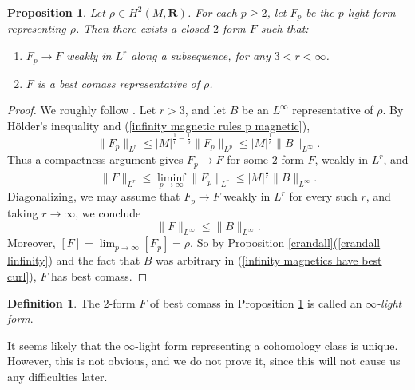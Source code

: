 \documentclass[reqno,11pt]{amsart}
\newcommand{\RR}{\mathbf{R}}
\newcommand{\dfn}[1]{\emph{#1}\index{#1}}
\newtheorem{proposition}[theorem]{Proposition}
\theoremstyle{definition}
\newtheorem{definition}[theorem]{Definition}
\numberwithin{equation}{section}
\begin{document}
\begin{proposition}\label{existence infinity}
Let $\rho \in H^2(M, \RR)$.
For each $p \geq 2$, let $F_p$ be the $p$-light form representing $\rho$. Then there exists a closed $2$-form $F$ such that:
\begin{enumerate}
\item $F_p \to F$ weakly in $L^r$ along a subsequence, for any $3 < r < \infty$.
\item $F$ is a best comass representative of $\rho$.
\end{enumerate}
\end{proposition}
\begin{proof}
We roughly follow \cite[\S3]{Lindqvist14}.
Let $r > 3$, and let $B$ be an $L^\infty$ representative of $\rho$.
By H\"older's inequality and (\ref{infinity magnetic rules p magnetic}),
\begin{equation}\label{uniform bounds in p by best curl}
	\|F_p\|_{L^r} \leq |M|^{\frac{1}{r} - \frac{1}{p}} \|F_p\|_{L^p} \leq |M|^{\frac{1}{r}} \|B\|_{L^\infty}.
\end{equation}
Thus a compactness argument gives $F_p \to F$ for some $2$-form $F$, weakly in $L^r$, and 
$$\|F\|_{L^r} \leq \liminf_{p \to \infty} \|F_p\|_{L^r} \leq |M|^{\frac{1}{r}} \|B\|_{L^\infty}.$$
Diagonalizing, we may assume that $F_p \to F$ weakly in $L^r$ for every such $r$, and taking $r \to \infty$, we conclude 
\begin{equation}\label{infinity magnetics have best curl}
	\|F\|_{L^\infty} \leq \|B\|_{L^\infty}.
\end{equation}
Moreover, $[F] = \lim_{p \to \infty} [F_p] = \rho$.
So by Proposition \ref{crandall}(\ref{crandall linfinity}) and the fact that $B$ was arbitrary in (\ref{infinity magnetics have best curl}), $F$ has best comass.
\end{proof}

\begin{definition}
The $2$-form $F$ of best comass in Proposition \ref{existence infinity} is called an \dfn{$\infty$-light form}.
\end{definition}

It seems likely that the $\infty$-light form representing a cohomology class is unique.
However, this is not obvious, and we do not prove it, since this will not cause us any difficulties later.
\end{document}
